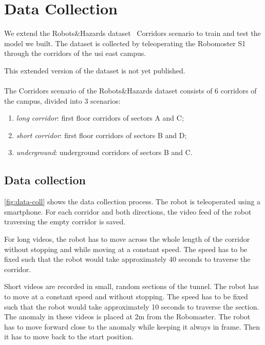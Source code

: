 \chapter{Data Collection}
\label{chap:data-coll}
            

     We extend the Robots\&Hazards dataset~\cite{mantegazza2022outlier} Corridors scenario to train and test the model we built. The dataset is collected by teleoperating the Robomoster S1 through the corridors of the \acrfull{usi} east campus.
     
     This extended version of the dataset is not yet published.
     \\
     \\
        The Corridors scenario of the Robots\&Hazards dataset consists of 6 corridors of the campus, divided into 3 scenarios:
        \begin{enumerate}
            \item \emph{long corridor}: first floor corridors of sectors A and C;
            \item \emph{short corridor}: first floor corridors of sectors B and D;
            \item \emph{underground}: underground corridors of sectors B and C.
        \end{enumerate}
    
    \section{Data collection}
    \autoref{fig:data-coll} shows the data collection process. The robot is teleoperated using a smartphone.
    For each corridor and both directions, the video feed of the robot traversing the empty corridor is saved.

    For long videos, the robot has to move across the whole length of the corridor without stopping and while moving at a constant speed. The speed has to be fixed such that the robot would take approximately 40 seconds to traverse the corridor.

    Short videos are recorded in small, random sections of the tunnel. The robot has to move at a constant speed and without stopping. The speed has to be fixed such that the robot would take approximately 10 seconds to traverse the section. The anomaly in these videos is placed at 2m from the Robomaster. The robot has to move forward close to the anomaly while keeping it always in frame. Then it has to move back to the start position.

